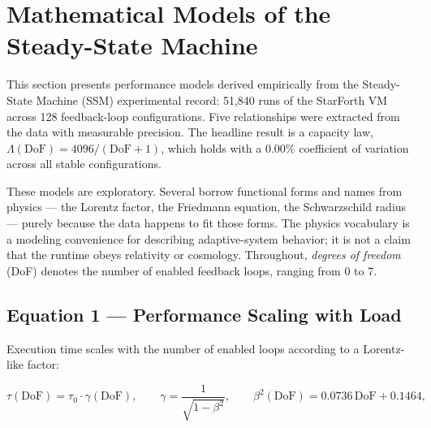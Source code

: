 
\section{Mathematical Models of the Steady-State Machine}


This section presents performance models derived empirically from the
Steady-State Machine (SSM) experimental record: 51{,}840 runs of the StarForth
VM across 128 feedback-loop configurations. Five relationships were extracted
from the data with measurable precision. The headline result is a capacity law,
$\Lambda(\mathrm{DoF}) = 4096 / (\mathrm{DoF}+1)$, which holds with a 0.00\%
coefficient of variation across all stable configurations.

These models are exploratory. Several borrow functional forms and names from
physics --- the Lorentz factor, the Friedmann equation, the Schwarzschild
radius --- purely because the data happens to fit those forms. The physics
vocabulary is a modeling convenience for describing adaptive-system behavior; it
is not a claim that the runtime obeys relativity or cosmology. Throughout,
\textit{degrees of freedom} (DoF) denotes the number of enabled feedback loops,
ranging from 0 to 7.

\subsection{Equation 1 --- Performance Scaling with Load}

Execution time scales with the number of enabled loops according to a Lorentz-like
factor:

\begin{equation}
\tau(\mathrm{DoF}) = \tau_0 \cdot \gamma(\mathrm{DoF}),
\qquad
\gamma = \frac{1}{\sqrt{1 - \beta^2}},
\qquad
\beta^2(\mathrm{DoF}) = 0.0736\,\mathrm{DoF} + 0.1464,
\end{equation}

